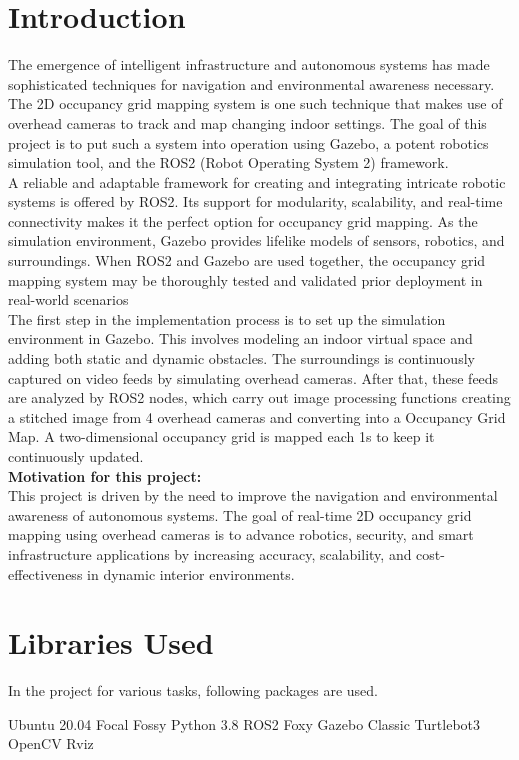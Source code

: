 \documentclass{josis}
\begin{document}
\section{Introduction}
 The emergence of intelligent infrastructure and autonomous systems has made sophisticated techniques for navigation and environmental awareness necessary. The 2D occupancy grid mapping system is one such technique that makes use of overhead cameras to track and map changing indoor settings. The goal of this project is to put such a system into operation using Gazebo, a potent robotics simulation tool, and the ROS2 (Robot Operating System 2) framework.\\
A reliable and adaptable framework for creating and integrating intricate robotic systems is offered by ROS2. Its support for modularity, scalability, and real-time connectivity makes it the perfect option for occupancy grid mapping. As the simulation environment, Gazebo provides lifelike models of sensors, robotics, and surroundings. When ROS2 and Gazebo are used together, the occupancy grid mapping system may be thoroughly tested and validated prior deployment in real-world scenarios\\
The first step in the implementation process is to set up the simulation environment in Gazebo. This involves modeling an indoor virtual space and adding both static and dynamic obstacles. The surroundings is continuously captured on video feeds by simulating overhead cameras. After that, these feeds are analyzed by ROS2 nodes, which carry out image processing functions creating a stitched image from 4 overhead cameras and converting into a Occupancy Grid Map. A two-dimensional occupancy grid is mapped each 1s to keep it continuously updated.\\
\newline
\textbf{Motivation for this project:}\\
This project is driven by the need to improve the navigation and environmental awareness of autonomous systems. The goal of real-time 2D occupancy grid mapping using overhead cameras is to advance robotics, security, and smart infrastructure applications by increasing accuracy, scalability, and cost-effectiveness in dynamic interior environments.



\section{Libraries Used}
In the project for various tasks, following packages are used.
\begin{python}
    Ubuntu 20.04 Focal Fossy
    Python 3.8
    ROS2 Foxy
    Gazebo Classic
    Turtlebot3
    OpenCV
    Rviz
    
\end{python}
\end{document}
